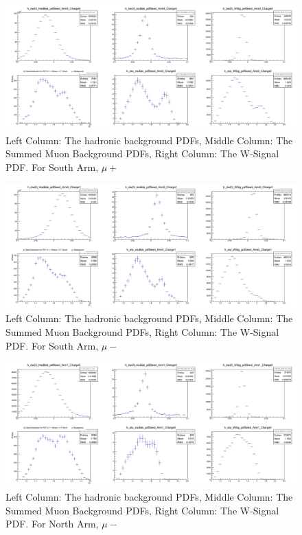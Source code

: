 \begin{figure}
  \centering
  \includegraphics[width=\linewidth]{./figures/c_dw23_Eta_PDF_Arm0_Charge0.png}
  \caption{
    Left Column: The hadronic background PDFs, Middle Column: The Summed Muon
    Background PDFs, Right Column: The W-Signal PDF. For South Arm, $\mu+$
  }
  \label{fig:c_dw23_Eta_PDF_Arm0_Charge0}
\end{figure}

\begin{figure}
  \centering
  \includegraphics[width=\linewidth]{././figures/c_dw23_Eta_PDF_Arm0_Charge1.png}
  \caption{
    Left Column: The hadronic background PDFs, Middle Column: The Summed Muon
    Background PDFs, Right Column: The W-Signal PDF. For South Arm, $\mu-$
  }
  \label{fig:c_dw23_Eta_PDF_Arm0_Charge1}
\end{figure}

\begin{figure}
  \centering
  \includegraphics[width=\linewidth]{././figures/c_dw23_Eta_PDF_Arm1_Charge0.png}
  \caption{
    Left Column: The hadronic background PDFs, Middle Column: The Summed Muon
    Background PDFs, Right Column: The W-Signal PDF. For North Arm, $\mu-$
  }
  \label{fig:c_dw23_Eta_PDF_Arm1_Charge0}
\end{figure}

